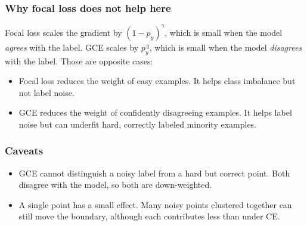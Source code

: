 \documentclass[11pt]{article}
\begin{document}
\subsubsection*{Why focal loss does not help here}

Focal loss scales the gradient by $(1 - p_y)^{\gamma}$, which is small when the model \emph{agrees} with the label. GCE scales by $p_y^{\,q}$, which is small when the model \emph{disagrees} with the label. Those are opposite cases:
\begin{itemize}[leftmargin=*]
  \item Focal loss reduces the weight of easy examples. It helps class imbalance but not label noise.
  \item GCE reduces the weight of confidently disagreeing examples. It helps label noise but can underfit hard, correctly labeled minority examples.
\end{itemize}

\subsubsection*{Caveats}

\begin{itemize}[leftmargin=*]
  \item GCE cannot distinguish a noisy label from a hard but correct point. Both disagree with the model, so both are down-weighted.
  \item A single point has a small effect. Many noisy points clustered together can still move the boundary, although each contributes less than under CE.
\end{itemize}

%
%
%
%
\end{document}
